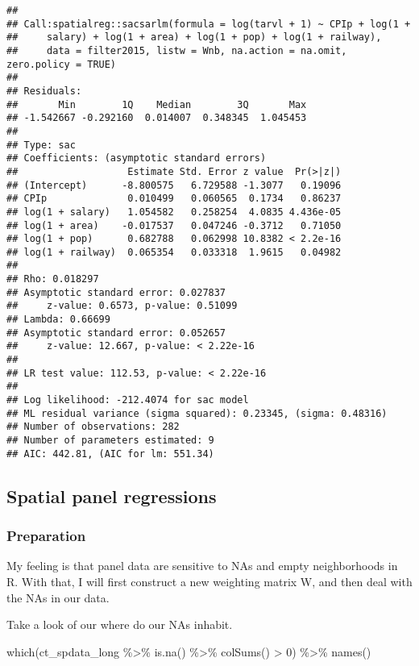 \documentclass[
]{article}
\newenvironment{Shaded}{\begin{snugshade}}{\end{snugshade}}
\newcommand{\DecValTok}[1]{\textcolor[rgb]{0.00,0.00,0.81}{#1}}
\newcommand{\FunctionTok}[1]{\textcolor[rgb]{0.00,0.00,0.00}{#1}}
\newcommand{\NormalTok}[1]{#1}
\newcommand{\SpecialCharTok}[1]{\textcolor[rgb]{0.00,0.00,0.00}{#1}}
\begin{document}
\begin{verbatim}
## 
## Call:spatialreg::sacsarlm(formula = log(tarvl + 1) ~ CPIp + log(1 + 
##     salary) + log(1 + area) + log(1 + pop) + log(1 + railway), 
##     data = filter2015, listw = Wnb, na.action = na.omit, zero.policy = TRUE)
## 
## Residuals:
##       Min        1Q    Median        3Q       Max 
## -1.542667 -0.292160  0.014007  0.348345  1.045453 
## 
## Type: sac 
## Coefficients: (asymptotic standard errors) 
##                   Estimate Std. Error z value  Pr(>|z|)
## (Intercept)      -8.800575   6.729588 -1.3077   0.19096
## CPIp              0.010499   0.060565  0.1734   0.86237
## log(1 + salary)   1.054582   0.258254  4.0835 4.436e-05
## log(1 + area)    -0.017537   0.047246 -0.3712   0.71050
## log(1 + pop)      0.682788   0.062998 10.8382 < 2.2e-16
## log(1 + railway)  0.065354   0.033318  1.9615   0.04982
## 
## Rho: 0.018297
## Asymptotic standard error: 0.027837
##     z-value: 0.6573, p-value: 0.51099
## Lambda: 0.66699
## Asymptotic standard error: 0.052657
##     z-value: 12.667, p-value: < 2.22e-16
## 
## LR test value: 112.53, p-value: < 2.22e-16
## 
## Log likelihood: -212.4074 for sac model
## ML residual variance (sigma squared): 0.23345, (sigma: 0.48316)
## Number of observations: 282 
## Number of parameters estimated: 9 
## AIC: 442.81, (AIC for lm: 551.34)
\end{verbatim}

\hypertarget{spatial-panel-regressions}{%
\subsection{Spatial panel regressions}\label{spatial-panel-regressions}}

\hypertarget{preparation}{%
\subsubsection{Preparation}\label{preparation}}

My feeling is that panel data are sensitive to NAs and empty
neighborhoods in R. With that, I will first construct a new weighting
matrix W, and then deal with the NAs in our data.

Take a look of our where do our NAs inhabit.

\begin{Shaded}
\begin{Highlighting}[]
\FunctionTok{which}\NormalTok{(ct\_spdata\_long }\SpecialCharTok{\%\textgreater{}\%} \FunctionTok{is.na}\NormalTok{()  }\SpecialCharTok{\%\textgreater{}\%} \FunctionTok{colSums}\NormalTok{() }\SpecialCharTok{\textgreater{}} \DecValTok{0}\NormalTok{) }\SpecialCharTok{\%\textgreater{}\%} \FunctionTok{names}\NormalTok{()}
\end{Highlighting}
\end{Shaded}
\end{document}
